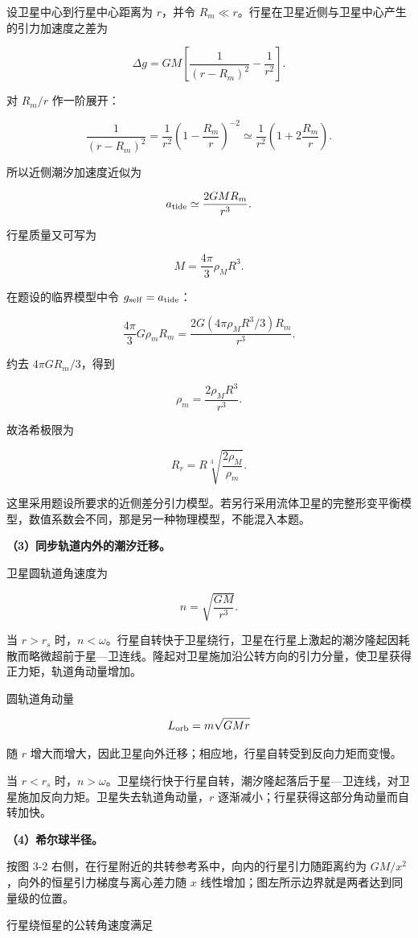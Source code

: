 \documentclass[12pt,a4paper,UTF8]{ctexart}
\begin{document}
设卫星中心到行星中心距离为 \(r\)，并令
\(R_m\ll r\)。行星在卫星近侧与卫星中心产生的引力加速度之差为

\[
\Delta g
=GM\left[\frac1{(r-R_m)^2}-\frac1{r^2}\right].
\]

对 \(R_m/r\) 作一阶展开：

\[
\frac1{(r-R_m)^2}
=\frac1{r^2}\left(1-\frac{R_m}{r}\right)^{-2}
\simeq\frac1{r^2}\left(1+2\frac{R_m}{r}\right).
\]

所以近侧潮汐加速度近似为

\[a_{\rm tide}\simeq\frac{2GMR_m}{r^3}.\]

行星质量又可写为

\[M=\frac{4\pi}{3}\rho_MR^3.\]

在题设的临界模型中令 \(g_{\rm self}=a_{\rm tide}\)：

\[\frac{4\pi}{3}G\rho_mR_m
=\frac{2G(4\pi\rho_MR^3/3)R_m}{r^3}.\]

约去 \(4\pi GR_m/3\)，得到

\[\rho_m=\frac{2\rho_MR^3}{r^3}.\]

故洛希极限为

\[\boxed{R_r=R\sqrt[3]{\frac{2\rho_M}{\rho_m}}}.\]

这里采用题设所要求的近侧差分引力模型。若另行采用流体卫星的完整形变平衡模型，数值系数会不同，那是另一种物理模型，不能混入本题。

\textbf{（3）同步轨道内外的潮汐迁移。}

卫星圆轨道角速度为

\[n=\sqrt{\frac{GM}{r^3}}.\]

当 \(r>r_s\)
时，\(n<\omega\)。行星自转快于卫星绕行，卫星在行星上激起的潮汐隆起因耗散而略微超前于星---卫连线。隆起对卫星施加沿公转方向的引力分量，使卫星获得正力矩，轨道角动量增加。

圆轨道角动量

\[L_{\rm orb}=m\sqrt{GMr}\]

随 \(r\)
增大而增大，因此卫星向外迁移；相应地，行星自转受到反向力矩而变慢。

当 \(r<r_s\)
时，\(n>\omega\)。卫星绕行快于行星自转，潮汐隆起落后于星---卫连线，对卫星施加反向力矩。卫星失去轨道角动量，\(r\)
逐渐减小；行星获得这部分角动量而自转加快。

\textbf{（4）希尔球半径。}

按图 3-2 右侧，在行星附近的共转参考系中，向内的行星引力随距离约为
\(GM/x^2\)，向外的恒星引力梯度与离心差力随 \(x\)
线性增加；图左所示边界就是两者达到同量级的位置。

行星绕恒星的公转角速度满足
\end{document}

